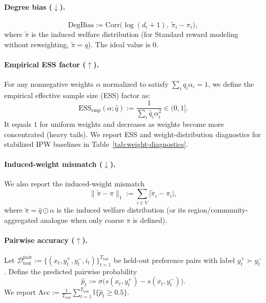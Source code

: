 \documentclass{article}
\theoremstyle{plain}
\theoremstyle{definition}
\theoremstyle{remark}
\begin{document}
\paragraph{Degree bias ($\downarrow$).}
\begin{equation}
\mathrm{DegBias} := \mathrm{Corr}\Big(\log(d_i+1),\ \tilde\pi_i - \pi_i\Big),
\end{equation}
where $\tilde\pi$ is the induced welfare distribution (for Standard reward
modeling without reweighting, $\tilde\pi=q$). The ideal value is $0$.

\paragraph{Empirical ESS factor ($\uparrow$).}
For any nonnegative weights $\alpha$ normalized to satisfy
$\sum_i \hat q_i \alpha_i = 1$, we define the empirical effective sample size
(ESS) factor as:
\begin{equation}
\mathrm{ESS}_{\mathrm{emp}}(\alpha;\hat q) := \frac{1}{\sum_i \hat q_i \alpha_i^2}\in (0,1].
\end{equation}
It equals $1$ for uniform weights and decreases as weights become more
concentrated (heavy tails). We report ESS and weight-distribution diagnostics
for stabilized IPW baselines in Table~\ref{tab:weight-diagnostics}.

\paragraph{Induced-weight mismatch ($\downarrow$).}
We also report the induced-weight mismatch
\begin{equation}
\|\tilde\pi-\pi\|_1 := \sum_{i\in V}\big|\tilde\pi_i-\pi_i\big|,
\end{equation}
where $\tilde\pi=\hat q\odot\alpha$ is the induced welfare distribution
(or its region/community-aggregated analogue when only coarse $\pi$ is defined).

\paragraph{Pairwise accuracy ($\uparrow$).}
Let $\mathcal{D}^{\mathrm{pair}}_{\text{test}}:=\{(x_t,y_t^+,y_t^-,i_t)\}_{t=1}^{T_{\text{test}}}$
be held-out preference pairs with label $y_t^+\succ y_t^-$. Define the predicted
pairwise probability
\begin{equation}
\hat p_t := \sigma\!\big(s(x_t,y_t^+) - s(x_t,y_t^-)\big).
\end{equation}
We report $\mathrm{Acc}:=\frac{1}{T_{\text{test}}}\sum_{t=1}^{T_{\text{test}}}\mathbb{I}\{\hat p_t\ge 0.5\}$.
\end{document}
